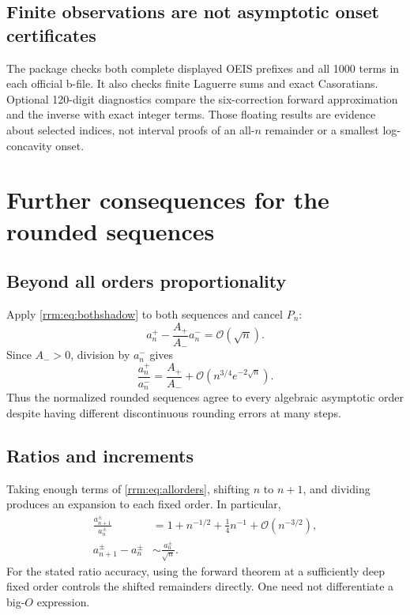\documentclass[11pt]{article}
\theoremstyle{remark}\newtheorem{remark}[theorem]{Remark}
\newcommand{\OO}{\mathcal O}
\begin{document}
\subsection{Finite observations are not asymptotic onset certificates}
The package checks both complete displayed OEIS prefixes and all 1000 terms in each official b-file. It also checks finite Laguerre sums and exact Casoratians. Optional 120-digit diagnostics compare the six-correction forward approximation and the inverse with exact integer terms. Those floating results are evidence about selected indices, not interval proofs of an all-$n$ remainder or a smallest log-concavity onset.

\section{Further consequences for the rounded sequences}\label{rrm:sec:consequences}
\subsection{Beyond all orders proportionality}
Apply \eqref{rrm:eq:bothshadow} to both sequences and cancel $P_n$:
\begin{equation}\label{rrm:eq:proportion}
 a_n^+-\frac{A_+}{A_-}a_n^-=\OO(\sqrt n).
\end{equation}
Since $A_->0$, division by $a_n^-$ gives
\begin{equation}\label{rrm:eq:ratioorbit}
 \frac{a_n^+}{a_n^-}=\frac{A_+}{A_-}
 +\OO\left(n^{3/4}e^{-2\sqrt n}\right).
\end{equation}
Thus the normalized rounded sequences agree to every algebraic asymptotic order despite having different discontinuous rounding errors at many steps.

\subsection{Ratios and increments}
Taking enough terms of \eqref{rrm:eq:allorders}, shifting $n$ to $n+1$, and dividing produces an expansion to each fixed order. In particular,
\begin{align}
 \frac{a_{n+1}^\pm}{a_n^\pm}
 &=1+n^{-1/2}+\frac14n^{-1}+\OO(n^{-3/2}),\label{rrm:eq:ratios}\\
 a_{n+1}^\pm-a_n^\pm&\sim\frac{a_n^\pm}{\sqrt n}.\label{rrm:eq:increments}
\end{align}
For the stated ratio accuracy, using the forward theorem at a sufficiently deep fixed order controls the shifted remainders directly. One need not differentiate a big-$O$ expression.
\end{document}
